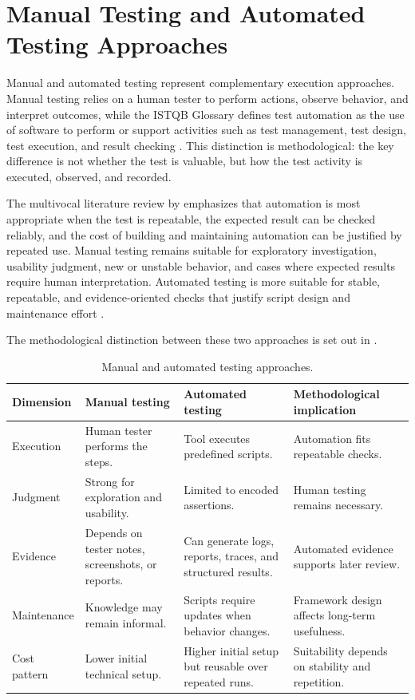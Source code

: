 \section{Manual Testing and Automated Testing Approaches}
\label{sec:ch2-manual-automated-testing}

Manual and automated testing represent complementary execution approaches. Manual testing relies on a human tester to perform actions, observe behavior, and interpret outcomes, while the ISTQB Glossary defines test automation as the use of software to perform or support activities such as test management, test design, test execution, and result checking \autocite{istqb_glossary_test_automation_2026}. This distinction is methodological: the key difference is not whether the test is valuable, but how the test activity is executed, observed, and recorded.

The multivocal literature review by \textcite{garousi_mantyla_automation_2016} emphasizes that automation is most appropriate when the test is repeatable, the expected result can be checked reliably, and the cost of building and maintaining automation can be justified by repeated use. Manual testing remains suitable for exploratory investigation, usability judgment, new or unstable behavior, and cases where expected results require human interpretation. Automated testing is more suitable for stable, repeatable, and evidence-oriented checks that justify script design and maintenance effort \autocite{istqb_ctfl_syllabus_2024,garousi_mantyla_automation_2016}.

The methodological distinction between these two approaches is set out in .

\begin{table}[htbp]
  \centering
  \tablefont
  \begin{tabularx}{\textwidth}{YYYY}
    \toprule
    Dimension & Manual testing & Automated testing & Methodological implication \\
    \midrule
    Execution & Human tester performs the steps. & Tool executes predefined scripts. & Automation fits repeatable checks. \\
    Judgment & Strong for exploration and usability. & Limited to encoded assertions. & Human testing remains necessary. \\
    Evidence & Depends on tester notes, screenshots, or reports. & Can generate logs, reports, traces, and structured results. & Automated evidence supports later review. \\
    Maintenance & Knowledge may remain informal. & Scripts require updates when behavior changes. & Framework design affects long-term usefulness. \\
    Cost pattern & Lower initial technical setup. & Higher initial setup but reusable over repeated runs. & Suitability depends on stability and repetition. \\
    \bottomrule
  \end{tabularx}
  \caption{Manual and automated testing approaches.}
  \label{tab:manual-automated-testing-approaches}
\end{table}

